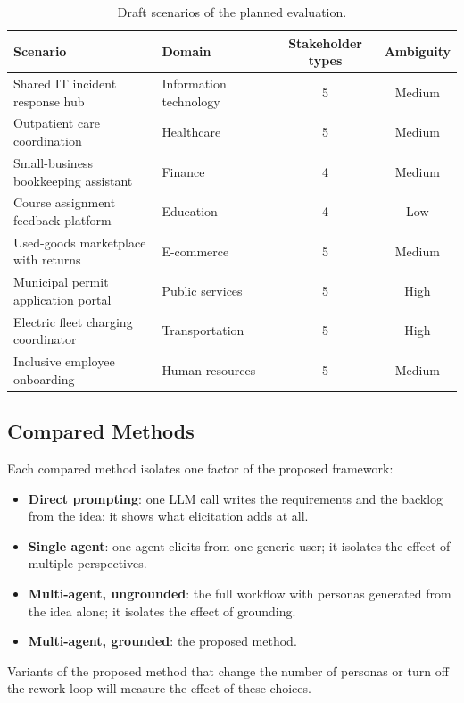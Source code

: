 \begin{table}[H]
    \centering
    \caption{Draft scenarios of the planned evaluation.}
    \label{tab:eval-scenarios}
    \begin{tabularx}{\linewidth}{|X|l|c|c|}
        \hline
        \textbf{Scenario} & \textbf{Domain} & \textbf{Stakeholder types} & \textbf{Ambiguity} \\
        \hline
        Shared IT incident response hub & Information technology & 5 & Medium \\
        Outpatient care coordination & Healthcare & 5 & Medium \\
        Small-business bookkeeping assistant & Finance & 4 & Medium \\
        Course assignment feedback platform & Education & 4 & Low \\
        Used-goods marketplace with returns & E-commerce & 5 & Medium \\
        Municipal permit application portal & Public services & 5 & High \\
        Electric fleet charging coordinator & Transportation & 5 & High \\
        Inclusive employee onboarding & Human resources & 5 & Medium \\
        \hline
    \end{tabularx}
\end{table}

\subsection{Compared Methods}
\label{sec:eval-baselines}
Each compared method isolates one factor of the proposed framework:
\begin{itemize}
    \item \textbf{Direct prompting}: one LLM call writes the requirements and the backlog from the idea; it shows what elicitation adds at all.
    \item \textbf{Single agent}: one agent elicits from one generic user; it isolates the effect of multiple perspectives.
    \item \textbf{Multi-agent, ungrounded}: the full workflow with personas generated from the idea alone; it isolates the effect of grounding.
    \item \textbf{Multi-agent, grounded}: the proposed method.
\end{itemize}
Variants of the proposed method that change the number of personas or turn off the rework loop will measure the effect of these choices.

